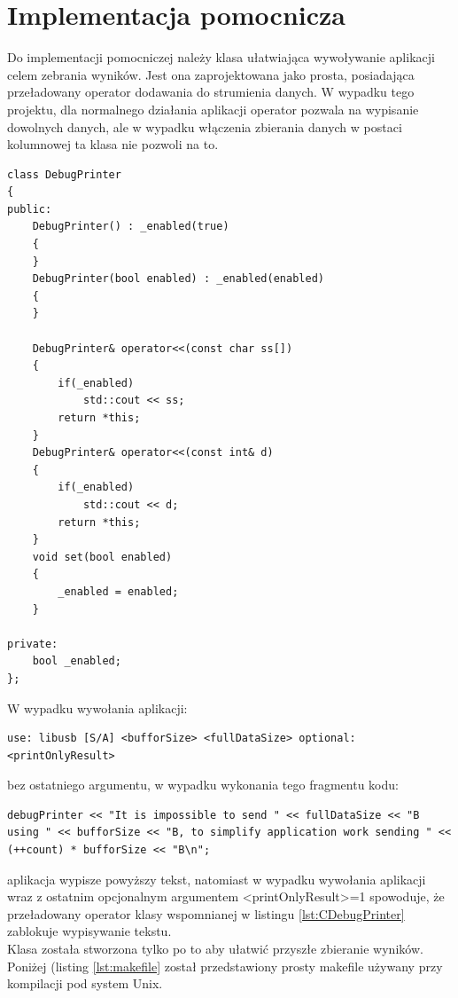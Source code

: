 \documentclass{BscUS}
\begin{document}
\section{Implementacja pomocnicza}
\label{sch:additionalImplementation}
Do implementacji pomocniczej należy klasa ułatwiająca wywoływanie aplikacji celem zebrania wyników. Jest ona zaprojektowana jako prosta, posiadająca przeładowany operator dodawania do strumienia danych. W wypadku tego projektu, dla normalnego działania aplikacji operator pozwala na wypisanie dowolnych danych, ale w wypadku włączenia zbierania danych w postaci kolumnowej ta klasa nie pozwoli na to.

\begin{lstlisting}[caption={Klasa DebugPrinter},label={lst:CDebugPrinter}]
class DebugPrinter
{
public:
	DebugPrinter() : _enabled(true)
	{
	}
	DebugPrinter(bool enabled) : _enabled(enabled)
	{
	}
	
	DebugPrinter& operator<<(const char ss[])
	{
		if(_enabled)
			std::cout << ss;
		return *this;
	}
	DebugPrinter& operator<<(const int& d)
	{
		if(_enabled)
			std::cout << d;
		return *this;
	}
	void set(bool enabled)
	{
		_enabled = enabled;
	}

private:
	bool _enabled;
};
\end{lstlisting}
W wypadku wywołania aplikacji:
\begin{lstlisting}[caption={Uruchomienie testu}]
use: libusb [S/A] <bufforSize> <fullDataSize> optional:<printOnlyResult>
\end{lstlisting}
bez ostatniego argumentu, w wypadku wykonania tego fragmentu kodu: 
\begin{lstlisting}[caption={Wypisywanie w zależności od argumentu wywołania aplikacji}]
debugPrinter << "It is impossible to send " << fullDataSize << "B using " << bufforSize << "B, to simplify application work sending " << (++count) * bufforSize << "B\n";
\end{lstlisting}
aplikacja wypisze powyższy tekst, natomiast w wypadku wywołania aplikacji wraz z ostatnim opcjonalnym argumentem <printOnlyResult>=1 spowoduje, że przeładowany operator klasy wspomnianej w listingu \ref{lst:CDebugPrinter} zablokuje wypisywanie tekstu. \\
Klasa została stworzona tylko po to aby ułatwić przyszłe zbieranie wyników.
\newline
\newline
Poniżej (listing \ref{lst:makefile} został przedstawiony prosty makefile używany przy kompilacji pod system Unix.
\end{document}
